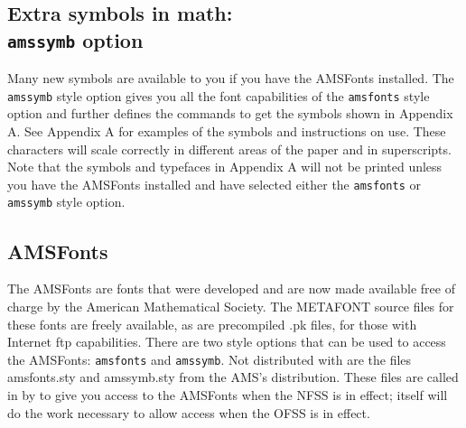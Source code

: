 \subsection[Extra symbols in math: {\protect\tt amssymb} option]%
{Extra symbols in math:\protect\\ {\protect\tt amssymb} option}

Many new symbols are available to you if you have the AMSFonts installed.
The \verb+amssymb+ style option gives you all the font capabilities of the
\verb+amsfonts+ style option and further defines the commands to get the
symbols shown in Appendix A. See Appendix A for examples of the symbols and
instructions on use. These characters will scale correctly in different
areas of the paper and in superscripts. Note that the symbols and typefaces
in Appendix A will not be printed unless you have the AMSFonts installed
and have selected either the \verb+amsfonts+ or \verb+amssymb+ style
option.


\subsection{AMSFonts}
\label{AMSFonts}


The AMSFonts are fonts that were developed and are now made available free
of charge by the American Mathematical Society. The METAFONT source files
for  these fonts are freely available, as are
precompiled .pk files, for those with Internet ftp capabilities. There are
two style options that can be used to access the AMSFonts: \verb+amsfonts+
and \verb+amssymb+.  Not distributed with \REVTeX{} are the files
amsfonts.sty and amssymb.sty from the AMS's \AmSLaTeX{} distribution. These
files are called in by \REVTeX{} to give you access to the AMSFonts when
the NFSS is in effect; \REVTeX{} itself will do the work necessary to allow
access when the OFSS is in effect.

